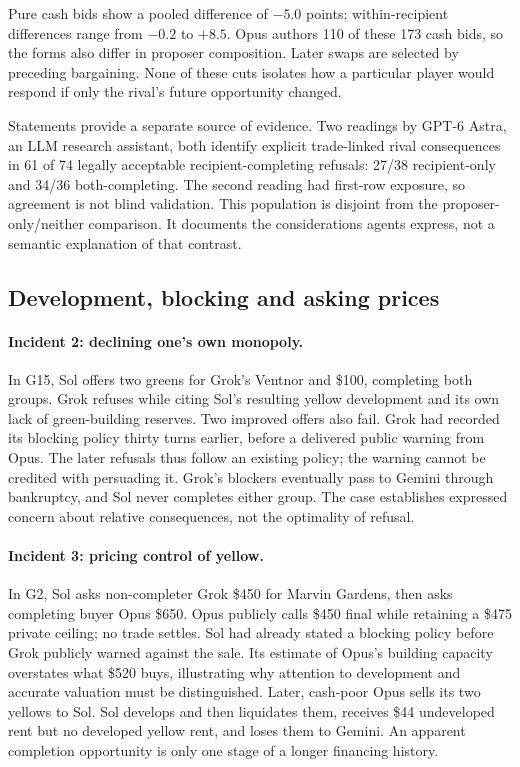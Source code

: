 Pure cash bids show a pooled difference of $-5.0$ points; within-recipient differences range from $-0.2$ to $+8.5$. Opus authors 110 of these 173 cash bids, so the forms also differ in proposer composition. Later swaps are selected by preceding bargaining. None of these cuts isolates how a particular player would respond if only the rival's future opportunity changed.

Statements provide a separate source of evidence. Two readings by GPT-6 Astra, an LLM research assistant, both identify explicit trade-linked rival consequences in 61 of 74 legally acceptable recipient-completing refusals: 27/38 recipient-only and 34/36 both-completing. The second reading had first-row exposure, so agreement is not blind validation. This population is disjoint from the proposer-only/neither comparison. It documents the considerations agents express, not a semantic explanation of that contrast.

\subsection{Development, blocking and asking prices}
\paragraph{Incident 2: declining one's own monopoly.}
In G15, Sol offers two greens for Grok's Ventnor and \$100, completing both groups. Grok refuses while citing Sol's resulting yellow development and its own lack of green-building reserves. Two improved offers also fail. Grok had recorded its blocking policy thirty turns earlier, before a delivered public warning from Opus. The later refusals thus follow an existing policy; the warning cannot be credited with persuading it. Grok's blockers eventually pass to Gemini through bankruptcy, and Sol never completes either group. The case establishes expressed concern about relative consequences, not the optimality of refusal.

\paragraph{Incident 3: pricing control of yellow.}
In G2, Sol asks non-completer Grok \$450 for Marvin Gardens, then asks completing buyer Opus \$650. Opus publicly calls \$450 final while retaining a \$475 private ceiling; no trade settles. Sol had already stated a blocking policy before Grok publicly warned against the sale. Its estimate of Opus's building capacity overstates what \$520 buys, illustrating why attention to development and accurate valuation must be distinguished. Later, cash-poor Opus sells its two yellows to Sol. Sol develops and then liquidates them, receives \$44 undeveloped rent but no developed yellow rent, and loses them to Gemini. An apparent completion opportunity is only one stage of a longer financing history.


